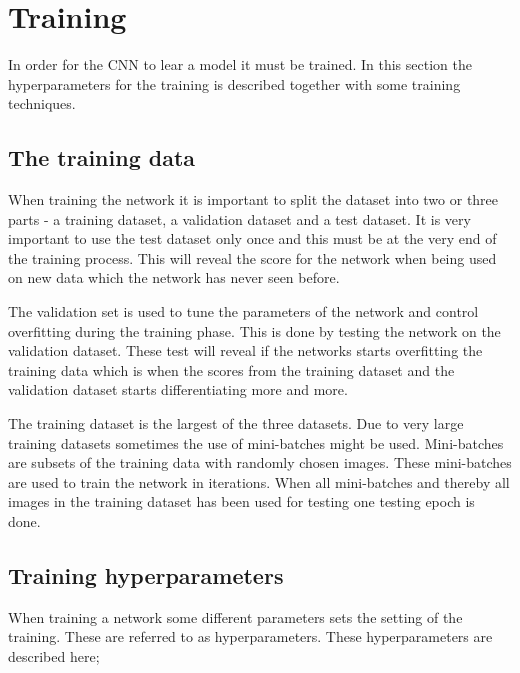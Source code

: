 \graphicspath{{Chapters/Project/}}

\section{Training} %
\label{sec:training}

In order for the CNN to lear a model it must be trained. In this section the hyperparameters for the training is described together with some training techniques.

\subsection{The training data} %
\label{sub:the_training_data}

When training the network it is important to split the dataset into two or three parts - a training dataset, a validation dataset and a test dataset. It is very important to use the test dataset only once and this must be at the very end of the training process. This will reveal the score for the network when being used on new data which the network has never seen before.

The validation set is used to tune the parameters of the network and control overfitting during the training phase. This is done by testing the network on the validation dataset. These test will reveal if the networks starts overfitting the training data which is when the scores from the training dataset and the validation dataset starts differentiating more and more.

The training dataset is the largest of the three datasets. Due to very large training datasets sometimes the use of mini-batches might be used. Mini-batches are subsets of the training data with randomly chosen images. These mini-batches are used to train the network in iterations. When all mini-batches and thereby all images in the training dataset has been used for testing one testing epoch is done.


\subsection{Training hyperparameters} %
\label{sub:training_hyperparameters}

When training a network some different parameters sets the setting of the training. These are referred to as hyperparameters. These hyperparameters are described here;

